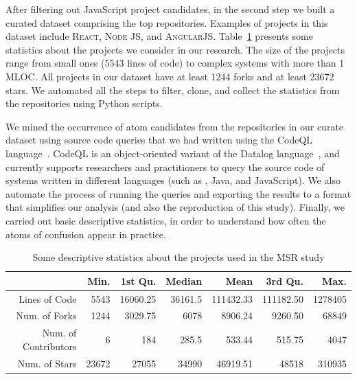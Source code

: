 After filtering out JavaScript project candidates, in the second step we built a curated dataset comprising the top \minedprojects repositories. Examples of projects in this dataset include \textsc{React}, \textsc{Node JS}, and \textsc{AngularJS}. Table~\ref{tab:projects-statistics} presents some statistics about the projects we consider in our research. The size of the projects range from small ones (5543 lines of code) to complex systems with more than 1 MLOC. All projects in our dataset have at least \num{1244} forks and at least \num{23672} stars. We automated all the steps to filter, clone, and collect the statistics from the repositories using Python scripts.

We mined the occurrence of atom candidates from the repositories in our curate dataset using source code queries that we had written using the CodeQL language~\cite{moor:gttse2007}. CodeQL is an object-oriented variant of the Datalog language~\cite{rodriguez2020efficient}, and currently supports researchers and practitioners to query the source code of systems written in different languages (such as \cpplang, Java, and JavaScript). We also automate the process of running the queries and exporting the results to a format that simplifies our
analysis (and also the reproduction of this study). Finally, we carried
out basic descriptive statistics, in order to understand how often the
atoms of confusion appear in practice. 

\begin{table}[ht]
 \centering
 \begin{tabular}{rrrrrrr}
   \hline
             & Min. & 1st Qu. & Median & Mean & 3rd Qu. & Max. \\ \hline
 Lines of Code           & \num{5543}  & \num{16060.25} & \num{36161.5} & \num{111432.33} & \num{111182.50} & \num{1278405} \\
 Num. of Forks     & \num{1244}   & \num{3029.75} & \num{6078} & \num{8906.24} & \num{9260.50} & \num{68849} \\
 Num. of Contributors  & \num{6}   & \num{184} & \num{285.5} & \num{533.44} & \num{515.75} & \num{4047} \\
 Num. of Stars        & \num{23672} & \num{27055} & \num{34990} & \num{46919.51} & \num{48518} & \num{310935} \\
 
    \hline
 \end{tabular}
 \caption{Some descriptive statistics about the projects used in the MSR study}
 \label{tab:projects-statistics} 
 \end{table}


